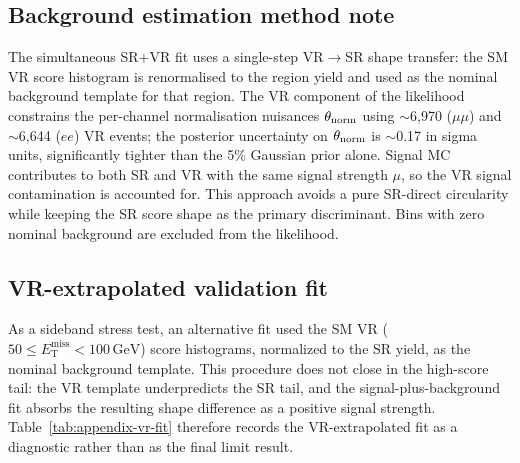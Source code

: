\documentclass[11pt,a4paper,twocolumn]{article}
\newcommand{\GeV}{\text{GeV}}
\newcommand{\MET}{\ensuremath{E_{\mathrm{T}}^{\mathrm{miss}}}}
\begin{document}
\subsection{Background estimation method note}
\label{app:background-method}

The simultaneous SR+VR fit uses a single-step VR$\to$SR shape transfer:
the SM VR score histogram is renormalised to the region yield and used
as the nominal background template for that region. The VR component of
the likelihood constrains the per-channel normalisation nuisances
$\theta_{\rm norm}$ using $\sim$6,970 ($\mu\mu$) and $\sim$6,644 ($ee$)
VR events; the posterior uncertainty on $\theta_{\rm norm}$ is
$\sim$0.17 in sigma units, significantly tighter than the 5\% Gaussian
prior alone. Signal MC contributes to both SR and VR with the same
signal strength $\mu$, so the VR signal contamination is accounted for.
This approach avoids a pure SR-direct circularity while keeping the SR
score shape as the primary discriminant.
Bins with zero nominal background are excluded from the likelihood.
\clearpage
\subsection{VR-extrapolated validation fit}
\label{app:vr-extrapolation}

As a sideband stress test, an alternative fit used the SM VR
(\(50\le\MET<100\,\GeV\)) score histograms, normalized to the SR yield, as the
nominal background template. This procedure does not close in the high-score tail:
the VR template underpredicts the SR tail, and the signal-plus-background fit absorbs
the resulting shape difference as a positive signal strength. Table~\ref{tab:appendix-vr-fit}
therefore records the VR-extrapolated fit as a diagnostic rather than as the final
limit result.

\begin{table}[t]
\centering
\caption{VR-extrapolated validation fit. The large positive fitted signal
strengths and weakened observed limits indicate VR-to-SR shape bias; these
numbers are not used for the final interpretation.}
\label{tab:appendix-vr-fit}
\end{table}
\end{document}
